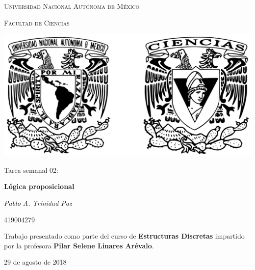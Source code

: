 \documentclass[11pt,letterpaper]{article}
\begin{document}
\begin{titlepage}
    \centering

    {\scshape\LARGE Universidad Nacional Autónoma de México \par}

    \vspace{1cm}
    {\scshape\Large Facultad de Ciencias\par}
    \vspace{1.5cm}

    \begin{center}
        \includegraphics[scale=.1]{../../assets/img/logo.png}
    \end{center}

    \vspace{.8 cm}

    {\LARGE Tarea semanal 02: \par}
    {\huge\bfseries Lógica proposicional \par}

    \vspace{0.5cm}
    {\large\itshape Pablo A. Trinidad Paz\par}
    419004279

    \vfill

    Trabajo presentado como parte del curso de \textbf{Estructuras Discretas}
    impartido por la profesora \textbf{Pilar Selene Linares Arévalo}. \par
    \vspace{0.1cm}
    {\large 29 de agosto de 2018\par}
\end{titlepage}
\end{document}

